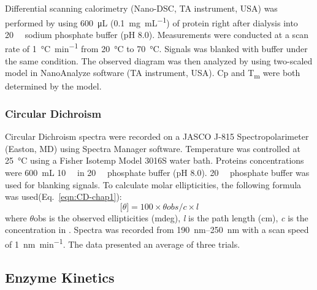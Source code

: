 \begin{refsection}
Differential scanning calorimetry (Nano-DSC, TA instrument, USA) was performed
by using \SI{600}{\micro\L} (\SI{0.1}{\mg\per\mL}) of protein right after
dialysis into \SI{20}{\milli\Molar} sodium phosphate buffer (pH 8.0).
Measurements were conducted at a scan rate of \SI{1}{\celsius\per\minute} from
\SI{20}{\celsius} to \SI{70}{\celsius}.  Signals was blanked with buffer under
the same condition.  The observed diagram was then analyzed by using
two-scaled model in NanoAnalyze software (TA instrument, USA). Cp and
T\textsubscript{m} were both determined by the model.

\subsubsection{Circular Dichroism}
\label{sec:cd-method}

Circular Dichroism spectra were recorded on a JASCO J-815 Spectropolarimeter
(Easton, MD) using Spectra Manager software. Temperature was controlled at
\SI{25}{\celsius} using a Fisher Isotemp Model 3016S water bath. Proteins
concentrations were \SI{600}{\mL} \SI{10}{\micro\Molar} in
\SI{20}{\milli\Molar} phosphate buffer (pH 8.0).  \SI{20}{\milli\Molar}
phosphate buffer was used for blanking signals. To calculate molar ellipticities, the
following formula was
used(Eq.~\ref{eqn:CD-chap1}): 
\begin{equation}
    \big[\theta\big] = 100 \times \theta obs / c \times l
    \label{eqn:CD-chap1}
\end{equation}
where $\theta$obs is the observed ellipticities (mdeg), \emph{l} is the path length (cm),
\emph{c} is the concentration in \SI{}{\Molar}. Spectra was recorded from
\SIrange{190}{250}{\nm} with a scan speed of \SI{1}{\nano\meter\per\minute}.
The data presented an average of three trials.

\subsection{Enzyme Kinetics}
\label{sec:kinetics-method}


\end{refsection}
